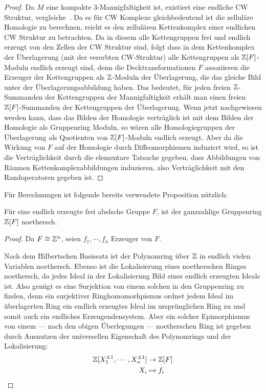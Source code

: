 	\begin{proof}
	Da $M$ eine kompakte 3-Mannigfaltigkeit ist, existiert eine endliche CW Struktur, vergleiche~\cite{Moise.1952}. Da es für CW Komplexe gleichbedeutend ist die zelluläre Homologie zu berechnen, reicht es den zellulären Kettenkomplex einer endlichen CW Struktur zu betrachten. Da in diesem alle Kettengruppen frei und endlich erzeugt von den Zellen der CW Struktur sind, folgt dass in dem Kettenkomplex der Überlagerung (mit der vererbten CW-Struktur) alle Kettengruppen als $\mathbb{Z}[F]$-Moduln endlich erzeugt sind, denn die Decktransformationen $F$ assoziieren die Erzeuger der Kettengruppen als $\mathbb{Z}$-Moduln der Überlagerung, die das gleiche Bild unter der Überlagerungsabbildung haben. Das bedeutet, für jeden freien $\mathbb{Z}$-Summanden der Kettengruppen der Mannigfaltigkeit erhält man einen freien $\mathbb{Z}[F]$-Summanden der Kettengruppen der Überlagerung. Wenn jetzt nachgewiesen werden kann, dass das Bilden der Homologie verträglich ist mit dem Bilden der Homologie als Gruppenring Moduln, so wären alle Homologiegruppen der Überlagerung als Quotienten von $\mathbb{Z}[F]$-Moduln endlich erzeugt. Aber da die Wirkung von $F$ auf der Homologie durch Diffeomorphismen induziert wird, so ist die Verträglichkeit durch die elementare Tatsache gegeben, dass Abbildungen von Räumen Kettenkomplexabbildungen induzieren, also Verträglichkeit mit den Randoperatoren gegeben ist.
\end{proof}

Für Berechnungen ist folgende bereits verwendete Proposition nützlich:
\begin{prop}
	Für eine endlich erzeugte frei abelsche Gruppe $F$, ist der ganzzahlige Gruppenring $\mathbb{Z}[F]$ noethersch.
\end{prop}
\begin{proof}
	Da $F\cong \mathbb{Z}^n$, seien $f_1,\cdots,f_n$ Erzeuger von $F$.

	Nach dem Hilbertschen Basissatz ist der Polynomring über $\mathbb{Z}$ in endlich vielen Variablen noethersch. Ebenso ist die Lokalisierung eines noetherschen Ringes noethersch, da jedes Ideal in der Lokalisierung Bild eines endlich erzeugten Ideals ist. Also genügt es eine Surjektion von einem solchen in den Gruppenring zu finden, denn ein surjektiver Ringhomomorhpismus ordnet jedem Ideal im überlagerten Ring ein endlich erzeugtes Ideal im ursprünglichen Ring zu und somit auch ein endliches Erzeugendensystem. Aber ein solcher Epimorphismus von einem --- nach den obigen Überlegungen --- noetherschen Ring ist gegeben durch Ausnutzen der universellen Eigenschaft des Polynomrings und der Lokalisierung:
	\begin{align*}
			\mathbb{Z}[X_1^{\pm 1},\cdots,X_{n}^{\pm 1}] & \to  \mathbb{Z}[F]\\
			X_i &\mapsto  f_i
	\end{align*}
\end{proof}

